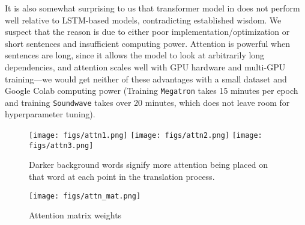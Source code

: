 \documentclass[12pt]{article}
\begin{document}
It is also somewhat surprising to us that transformer model in 
\cite{vaswani2017attention} does not perform well relative to LSTM-based models,
contradicting established wisdom. We suspect that the reason is due to either
poor implementation/optimization or short sentences and insufficient computing
power. Attention is powerful when sentences are long, since it allows the model
to look at arbitrarily long dependencies, and attention scales well with GPU
hardware and multi-GPU training---we would get neither of these advantages with
a small dataset and
Google Colab computing power (Training \texttt{Megatron} takes 15 minutes per
epoch and training \texttt{Soundwave} takes over 20 minutes, which does not
leave room for hyperparameter tuning).

\begin{figure}
	\centering
	\texttt{[image: figs/attn1.png]}
	\texttt{[image: figs/attn2.png]}
	\texttt{[image: figs/attn3.png]}
	\caption{Darker background words signify more attention being placed on that word at each point in the translation process.}
	\label{fig:word_weights}
\end{figure}

\begin{figure}
	\centering
	\texttt{[image: figs/attn\_mat.png]}
	\caption{Attention matrix weights}
	\label{fig:mat_weights}
\end{figure}
\end{document}
